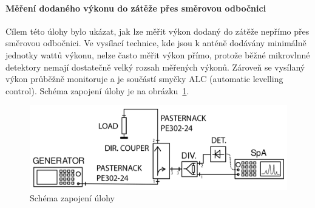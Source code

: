 \documentclass[11pt,a4paper]{article}
\begin{document}
\paragraph*{Měření dodaného výkonu do zátěže přes směrovou odbočnici} Cílem této úlohy bylo ukázat, jak lze měřit výkon dodaný do zátěže nepřímo přes směrovou odbočnici. Ve vysílací technice, kde jsou k anténě dodávány minimálně jednotky wattů výkonu, nelze často měřit výkon přímo, protože běžné mikrovlnné detektory nemají dostatečně velký rozsah měřených výkonů. Zároveň se vysílaný výkon průběžně monitoruje a je součástí smyčky ALC (automatic levelling control). Schéma zapojení úlohy je na obrázku~\ref{fig:task2-zapojeni}.
\begin{figure}[!ht]
    \centering
    \includegraphics[width=.8\textwidth]{src/task2-zapojeni.png}
    \caption{\label{fig:task2-zapojeni}Schéma zapojení úlohy}
\end{figure}
\end{document}
